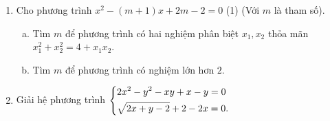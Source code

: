 \begin{ex}%
\hfill
\begin{enumerate}[1)]
\item Cho phương trình $x^2-(m+1)x+2m-2=0$ (1) (Với $m$ là tham số).
\begin{enumerate}[a)]
\item Tìm $m$ để phương trình có hai nghiệm phân biệt $x_1,x_2$ thỏa mãn $x_1^2+x_2^2=4+x_1x_2$.
\item Tìm $m$ để phương trình có nghiệm lớn hơn $2$.
\end{enumerate}
\item Giải hệ phương trình $\left\{\begin{aligned}& 2x^2-y^2-xy+x-y=0\\ &\sqrt{2x+y-2}+2-2x=0.\end{aligned}\right.$
\end{enumerate}
\end{ex}
